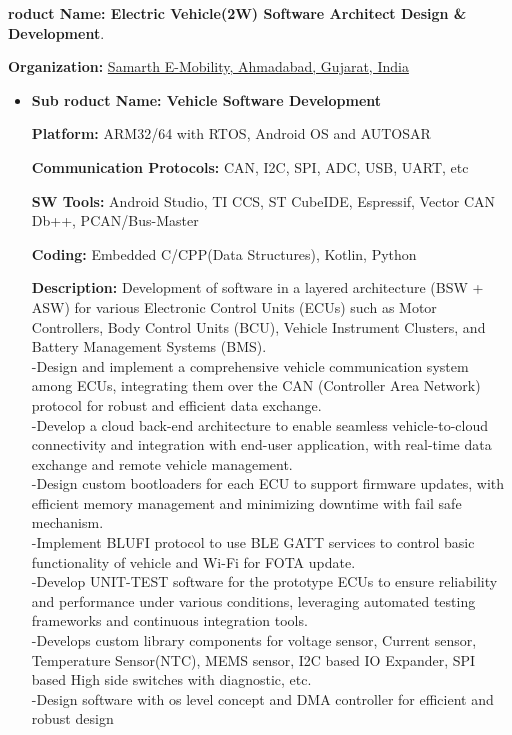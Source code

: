 
\hfill
\newline
\hspace{-10mm} \textbf{\large {\faProductHunt}roduct Name: Electric Vehicle(2W) Software Architect Design \& Development}.\par
\hspace{10mm} \textbf{Organization:} \href{https://samarthemobility.com/}{Samarth E-Mobility, Ahmadabad, Gujarat, India}\par
\begin{itemize}
    
    \item{\textbf{Sub {\faProductHunt}roduct Name: {Vehicle Software Development}}}\par
    \textbf{Platform:} ARM32/64 with RTOS, Android OS and AUTOSAR\par
    \textbf{Communication Protocols:} CAN, I2C, SPI, ADC, USB, UART, etc\par
    \textbf{SW Tools:} Android Studio, TI CCS, ST CubeIDE, Espressif, Vector CAN Db++, PCAN/Bus-Master\par
    \textbf{Coding:} Embedded C/CPP(Data Structures), Kotlin, Python\par
    \textbf{Description:} Development of software in a layered architecture (BSW + ASW) for various Electronic Control Units (ECUs) such as Motor Controllers, Body Control Units (BCU), Vehicle Instrument Clusters, and Battery Management Systems (BMS). \\-Design and implement a comprehensive vehicle communication system among ECUs, integrating them over the CAN (Controller Area Network) protocol for robust and efficient data exchange.\\-Develop a cloud back-end architecture to enable seamless vehicle-to-cloud connectivity and integration with end-user application, with real-time data exchange and remote vehicle management. \\-Design custom bootloaders for each ECU to support firmware updates, with efficient memory management and minimizing downtime with fail safe mechanism. \\-Implement BLUFI protocol to use BLE GATT services to control basic functionality of vehicle and Wi-Fi for FOTA update.\\-Develop UNIT-TEST software for the prototype ECUs to ensure reliability and performance under various conditions, leveraging automated testing frameworks and continuous integration tools.\\-Develops custom library components for voltage sensor, Current sensor, Temperature Sensor(NTC), MEMS sensor, I2C based IO Expander, SPI based High side switches with diagnostic, etc. \\-Design software with os level concept and DMA controller for efficient and robust design\par
\par


\end{itemize}
